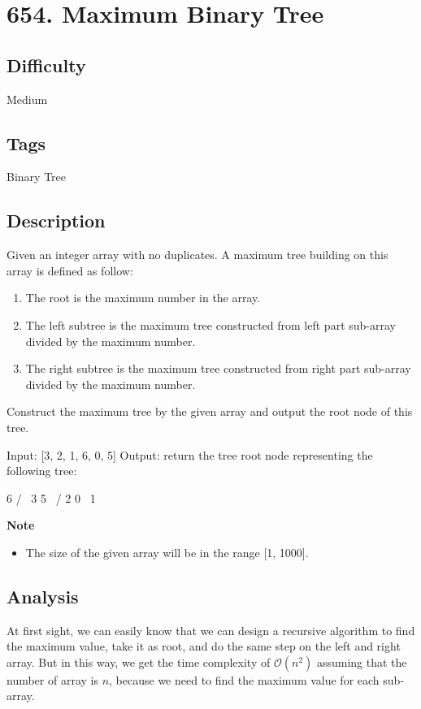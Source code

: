 \tocless\section{654. Maximum Binary Tree}
\label{algo:654}

\subsection*{Difficulty}
Medium

\subsection*{Tags}
Binary Tree

\subsection*{Description}
Given an integer array with no duplicates. A maximum tree building on this array is defined as follow:
\begin{enumerate}
	\item The root is the maximum number in the array.
	\item The left subtree is the maximum tree constructed from left part sub-array divided by the maximum number.
	\item The right subtree is the maximum tree constructed from right part sub-array divided by the maximum number.
\end{enumerate}

Construct the maximum tree by the given array and output the root node of this tree.

\begin{example}
\begin{multilinecode}
Input: [3, 2, 1, 6, 0, 5]
Output: return the tree root node representing the following tree:

      6
    /   \
   3     5
    \    / 
     2  0   
       \
        1
\end{multilinecode}
\end{example}

\textbf{Note}
\begin{itemize}
\item The size of the given array will be in the range [1, 1000].
\end{itemize}

\subsection*{Analysis}
At first sight, we can easily know that we can design a recursive algorithm to find the maximum value, take it as root, and do the same step on the left and right array. But in this way, we get the time complexity of $\mathcal{O}(n^2)$ assuming that the number of array is $n$, because we need to find the maximum value for each sub-array.

